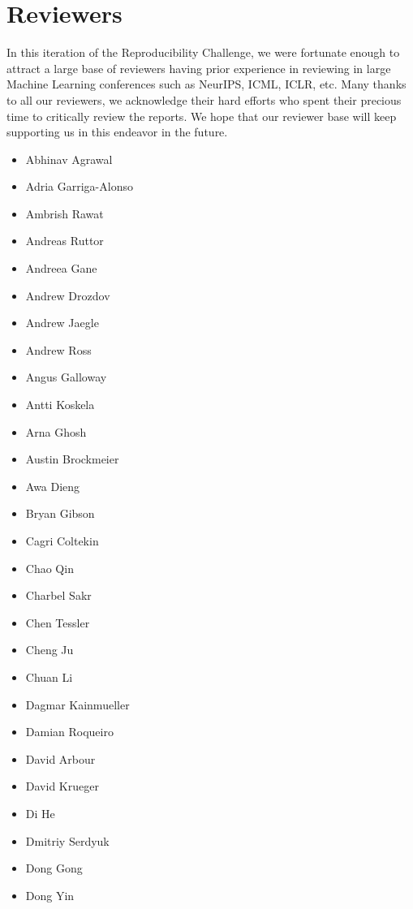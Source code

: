 \section{Reviewers}

In this iteration of the Reproducibility Challenge, we were fortunate enough to attract a large base of reviewers having prior experience in reviewing in large Machine Learning conferences such as NeurIPS, ICML, ICLR, etc. Many thanks to all our reviewers, we acknowledge their hard efforts who spent their precious time to critically review the reports. We hope that our reviewer base will keep supporting us in this endeavor in the future.

\begin{multicols}{3}
\begin{itemize}[label={}]
    \item Abhinav Agrawal
    \item Adria Garriga-Alonso
    \item Ambrish Rawat
    \item Andreas Ruttor
    \item Andreea Gane
    \item Andrew Drozdov
    \item Andrew Jaegle
    \item Andrew Ross
    \item Angus Galloway
    \item Antti Koskela
    \item Arna Ghosh
    \item Austin Brockmeier
    \item Awa Dieng
    \item Bryan Gibson
    \item Cagri Coltekin
    \item Chao Qin
    \item Charbel Sakr
    \item Chen Tessler
    \item Cheng Ju
    \item Chuan Li
    \item Dagmar Kainmueller
    \item Damian Roqueiro
    \item David Arbour
    \item David Krueger
    \item Di He
    \item Dmitriy Serdyuk
    \item Dong Gong
    \item Dong Yin

\end{itemize}
\end{multicols}
